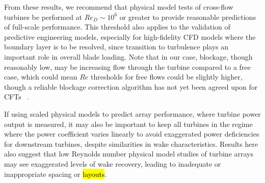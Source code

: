 \documentclass[energies,article,accept,moreauthors,pdftex,10pt,a4paper]{mdpi}
\theoremstyle{mdpi}
\newcounter{thm}
\newcounter{ex}
\newcounter{re}
\begin{document}
From these results, we recommend that physical model tests of cross-flow turbines
be performed at $Re_D \sim 10^6$ or greater to provide reasonable predictions of
full-scale performance. This threshold also applies to the validation of
predictive engineering models, especially for high-fidelity CFD models where the
boundary layer is to be resolved, since transition to turbulence plays an
important role in overall blade loading. Note that in our case, blockage, though
reasonably low, may be increasing flow through the turbine compared to a free
case, which could mean $Re$ thresholds for free flows could be slightly higher,
though a reliable blockage correction algorithm has not yet been agreed upon for
CFTs~ \cite{Cavagnaro2014}.

If using scaled physical models to predict array performance, where turbine
power output is measured, it may also be important to keep all turbines in the
regime where the power coefficient varies linearly to avoid exaggerated power
deficiencies for downstream turbines, despite similarities in wake
characteristics. Results here also suggest that low Reynolds number physical
model studies of turbine arrays may see exaggerated levels of wake recovery,
leading to inadequate or inappropriate spacing or \hl {layouts}.

\vspace{6pt}




\renewcommand\bibname{References}
%
%
%
%
\end{document}
